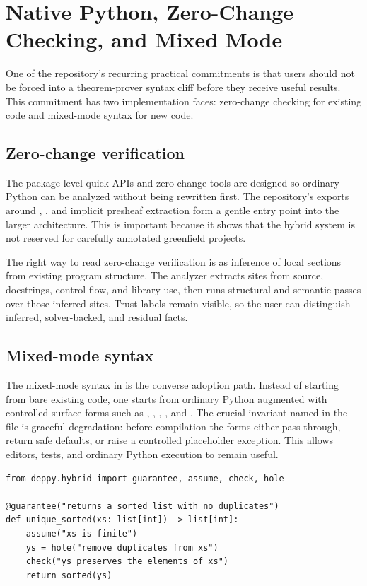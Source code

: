 \chapter{Native Python, Zero-Change Checking, and Mixed Mode}

One of the repository's recurring practical commitments is that users should not be forced
into a theorem-prover syntax cliff before they receive useful results. This commitment has
two implementation faces: zero-change checking for existing code and mixed-mode syntax for
new code.

\section*{Zero-change verification}
The package-level quick APIs and zero-change tools are designed so ordinary Python can be
analyzed without being rewritten first. The repository's exports around
, , and implicit presheaf extraction form a gentle
entry point into the larger architecture. This is important because it shows that the
hybrid system is not reserved for carefully annotated greenfield projects.

The right way to read zero-change verification is as inference of local sections from
existing program structure. The analyzer extracts sites from source, docstrings, control
flow, and library use, then runs structural and semantic passes over those inferred sites.
Trust labels remain visible, so the user can distinguish inferred, solver-backed, and
residual facts.

\section*{Mixed-mode syntax}
The mixed-mode syntax in  is the converse
adoption path. Instead of starting from bare existing code, one starts from ordinary Python
augmented with controlled surface forms such as , ,
, , and . The crucial invariant named in the file
is graceful degradation: before compilation the forms either pass through, return safe
defaults, or raise a controlled placeholder exception. This allows editors, tests, and
ordinary Python execution to remain useful.

\begin{lstlisting}
from deppy.hybrid import guarantee, assume, check, hole

@guarantee("returns a sorted list with no duplicates")
def unique_sorted(xs: list[int]) -> list[int]:
    assume("xs is finite")
    ys = hole("remove duplicates from xs")
    check("ys preserves the elements of xs")
    return sorted(ys)
\end{lstlisting}

